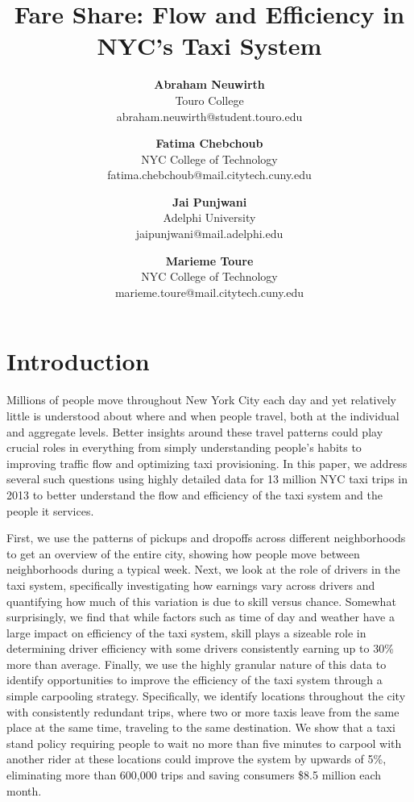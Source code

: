 \documentclass[twocolumn]{article}
\title{\vspace{-0.25in}Fare Share: Flow and Efficiency in NYC's Taxi System}
\author{
\normalsize{\textbf{Abraham Neuwirth}}\\ 
\small Touro College \\ 
\small abraham.neuwirth@student.touro.edu
\and 
\normalsize{\textbf{Fatima Chebchoub}}\\ 
\small NYC College of Technology\\ 
\small fatima.chebchoub@mail.citytech.cuny.edu 
\and 
\normalsize{\textbf{Jai Punjwani}}\\
\small Adelphi University\\
\small jaipunjwani@mail.adelphi.edu 
\and 
\normalsize{\textbf{Marieme Toure}}\\ 
\small NYC College of Technology\\ 
\small marieme.toure@mail.citytech.cuny.edu
}
\date{\vspace{-5ex}}
\begin{document}
\maketitle

\section{Introduction}

Millions of people move throughout New York City each day and yet relatively little is understood about where and when people travel, both at the individual and aggregate levels.
Better insights around these travel patterns could play crucial roles in everything from simply understanding people's habits to improving traffic flow and optimizing taxi provisioning.
In this paper, we address several such questions using highly detailed data for 13 million NYC taxi trips in 2013 to better understand the flow and efficiency of the taxi system and the people it services.

First, we use the patterns of pickups and dropoffs across different neighborhoods to get an overview of the entire city, showing how people move between neighborhoods during a typical week.
Next, we look at the role of drivers in the taxi system, specifically investigating how earnings vary across drivers and quantifying how much of this variation is due to skill versus chance.
Somewhat surprisingly, we find that while factors such as time of day and weather have a large impact on efficiency of the taxi system, skill plays a sizeable role in determining driver efficiency with some drivers consistently earning up to 30\% more than average.
Finally, we use the highly granular nature of this data to identify opportunities to improve the efficiency of the taxi system through a simple carpooling strategy.
Specifically, we identify locations throughout the city with consistently redundant trips, where two or more taxis leave from the same place at the same time, traveling to the same destination.
We show that a taxi stand policy requiring people to wait no more than five minutes to carpool with another rider at these locations could improve the system by upwards of 5\%, eliminating more than 600,000 trips and saving consumers \$8.5 million each month.
\end{document}
